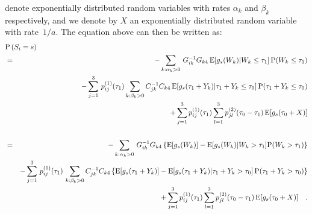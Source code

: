 \documentclass[11pt]{article}
\begin{document}
denote exponentially distributed random variables with rates $\alpha_{k}$ and $\beta_{k}$ respectively, and we denote by $X$ an exponentially distributed random variable with rate~$1/a$.  The equation above can then be written as:
\small
\begin{eqnarray*}
\lefteqn{ \mathrm{P}\left(S_{i}=s\right) } \\
&=&-\displaystyle\sum_{k:\alpha_{k}>0}\,G^{-1}_{ik}G_{k4}\,\mathrm{E}[g_{s}(W_{k})|W_{k}\leq \tau_{1}]\,\mathrm{P}\!\left(W_{k}\leq \tau_{1}\right)  \\
&&- \displaystyle \sum_{j=1}^{3}\,p^{(1)}_{ij}(\tau_{1}) \displaystyle\sum_{k:\beta_{k}>0} C_{jk}^{-1}C_{k4}\,\mathrm{E}[g_{s}(\tau_{1}+Y_{k})|\tau_{1}+Y_{k}\leq \tau_{0}]\,\mathrm{P}\!\left(\tau_{1}+Y_{k}\leq \tau_{0}\right)\\
&&+\displaystyle \sum_{j=1}^{3} p^{(1)}_{ij}(\tau_{1})\displaystyle\sum_{l=1}^{3}p^{(2)}_{jl}(\tau_{0}-\tau_{1})\,\mathrm{E}[g_{s}(\tau_{0}+X)] \\
\\
&=&-\displaystyle\sum_{k:\alpha_{k}>0}\,G^{-1}_{ik}G_{k4}\left\lbrace\mathrm{E}[g_{s}(W_{k})]-\mathrm{E}[g_{s}(W_{k})|W_{k}> \tau_{1}]\mathrm{P}\!\left(W_{k}> \tau_{1}\right)\right\rbrace \\
&&- \displaystyle \sum_{j=1}^{3}\,p^{(1)}_{ij}(\tau_{1})\, \displaystyle\sum_{k:\beta_{k}>0} C_{jk}^{-1}C_{k4}\left\lbrace\mathrm{E}[g_{s}(\tau_{1}+Y_{k})]
-\mathrm{E}[g_{s}(\tau_{1}+Y_{k})|\tau_{1}+Y_{k}> \tau_{0}]\,\mathrm{P}\!\left(\tau_{1}+Y_{k}>\tau_{0}\right)\right\rbrace\\
&&+\displaystyle\sum_{j=1}^{3} p^{(1)}_{ij}(\tau_{1})\displaystyle\sum_{l=1}^{3}p^{(2)}_{jl}(\tau_{0}-\tau_{1})\,\mathrm{E}[g_{s}(\tau_{0}+X)] \quad .
\end{eqnarray*}
\end{document}
